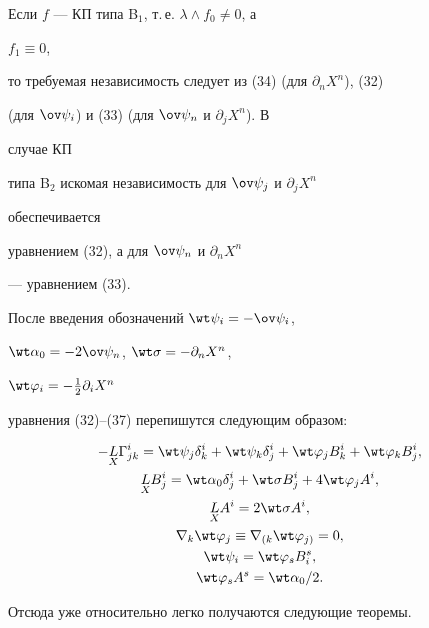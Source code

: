  


Если $f$ --- КП типа B$_1$, т.\,е. $\lambda\wedge f_0\ne0$, а 


$f_1\equiv0$, 


то требуемая независимость следует из (34) (для $\partial_n X^n$), (32) 


(для $\ov \psi_i$) и (33) (для $\ov \psi_n$ и $\partial_j X^n$). В 


случае КП 


типа B$_2$ искомая независимость для $\ov\psi _j$ и $\partial_j X^n$ 


обеспечивается 


уравнением (32), а для $\ov\psi_n$ и $\partial_n X^n$ 


--- уравнением (33). 


 


После введения обозначений $\wt\psi_i=-\ov\psi_i$, 


$\wt\alpha_0=-2\ov\psi_n$, $\wt\sigma=-\partial_n X^n$, 


$\wt\varphi_i=-\frac{1}{2}\partial_i X^n$ 


уравнения (32)--(37) перепишутся следующим образом: 


\begin{gather} 


-\down{X}{L}\Gamma^i_{j k}=\wt\psi_j\delta^i_k+ 


\wt\psi_k\delta^i_j+\wt\varphi_j B^i_k+\wt\varphi_k B^i_j,\\ 


% 


\down{X}{L}B^i_j=\wt\alpha_0\delta^i_j+ 


\wt\sigma B^i_j+4\wt\varphi_j A^i,\\ 


% 


\down{X}{L}A^i=2\wt\sigma A^i,\\ 


% 


\nabla_k\wt\varphi_j\equiv\nabla_{(k}\wt\varphi_{j)}=0,\\ 


% 


\wt\psi_i=\wt\varphi_s B^s_i,\\ 


% 


\wt\varphi_s A^s=\wt\alpha_0/2. 


\end{gather} 


Отсюда уже относительно легко получаются следующие теоремы. 


